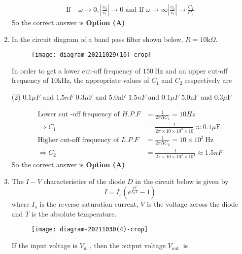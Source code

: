\begin{enumerate}
\begin{answer}
\begin{align*}
	\text{If }&\omega \rightarrow 0,\left|\frac{v_{0}}{v_{i}}\right| \rightarrow 0\text{ and If }\omega \rightarrow \infty\left|\frac{v_{0}}{v_{i}}\right| \rightarrow \frac{C_{1}}{C_{2}}
	\end{align*}
	So the correct answer is \textbf{Option (A)}
\end{answer}
	\item In the circuit diagram of a band pass filter shown below, $R=10 \mathrm{k} \Omega$.\\
	\begin{figure}[H]
		\centering
		\texttt{[image: diagram-20211029(10)-crop]}
	\end{figure}
	In order to get a lower cut-off frequency of $150 \mathrm{~Hz}$ and an upper cut-off frequency of $10 \mathrm{kHz}$, the appropriate values of $C_{1}$ and $C_{2}$ respectively are
	{	}
	\begin{tasks}(2)
		\task[\textbf{A.}]  $0.1 \mu F$ and $1.5 n F$
		\task[\textbf{B.}] $0.3 \mu \mathrm{F}$ and $5.0 \mathrm{nF}$
		\task[\textbf{C.}] $1.5 n F$ and $0.1 \mu F$
		\task[\textbf{D.}]  $5.0 \mathrm{nF}$ and $0.3 \mu \mathrm{F}$
	\end{tasks}
\begin{answer}
	\begin{align*}
	\text{Lower cut -off frequency of }H . P . F&=\frac{1}{2 \pi R C_{1}}=10 H z\\
	\Rightarrow C_{1}&=\frac{1}{2 \pi \times 10 \times 10^{3} \times 10} \approx 0.1 \mu \mathrm{F}\\
	\text{Higher cut-off frequency of }L . P . F&=\frac{1}{2 \pi R C_{2}}=10 \times 10^{3} \mathrm{~Hz}\\
	\Rightarrow C_{2}&=\frac{1}{2 \pi \times 10 \times 10^{3} \times 10^{4}} \approx 1.5 n F
	\end{align*}
	So the correct answer is \textbf{Option (A)}
\end{answer}
	\item The $I-V$ characteristics of the diode $D$ in the circuit below is given by
	$$
	I=I_{s}\left(e^{\frac{q V}{k_{\mathrm{B}} T}}-1\right)
	$$
	where $I_{s}$ is the reverse saturation current, $V$ is the voltage across the diode and $T$ is the absolute temperature.\\
	\begin{figure}[H]
		\centering
		\texttt{[image: diagram-20211030(4)-crop]}
		\caption{}
		\label{}
	\end{figure}
	If the input voltage is $V_{\text {in }}$, then the output voltage $V_{\text {out }}$ is

\end{enumerate}
